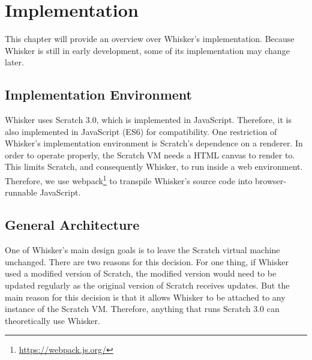 \chapter{Implementation}
\label{cha:implementation}

This chapter will provide an overview over Whisker's implementation.
Because Whisker is still in early development, some of its implementation may change later.

%
%

\section{Implementation Environment}
\label{sec:implementation_environment}

Whisker uses Scratch 3.0, which is implemented in JavaScript.
Therefore, it is also implemented in JavaScript (ES6) for compatibility.
One restriction of Whisker's implementation environment is Scratch's dependence on a renderer.
In order to operate properly, the Scratch VM needs a HTML canvas to render to.
This limits Scratch, and consequently Whisker, to run inside a web environment.
Therefore, we use webpack\footnote{\url{https://webpack.js.org/}} to transpile Whisker's source code into browser-runnable JavaScript.

\section{General Architecture}
\label{sec:general_architecture}

One of Whisker's main design goals is to leave the Scratch virtual machine unchanged.
There are two reasons for this decision.
For one thing, if Whisker used a modified version of Scratch,
the modified version would need to be updated regularly as the original version of Scratch receives updates.
But the main reason for this decision is that it allows Whisker to be attached to any instance of the Scratch VM.
Therefore, anything that runs Scratch 3.0 can theoretically use Whisker.
\parspace

